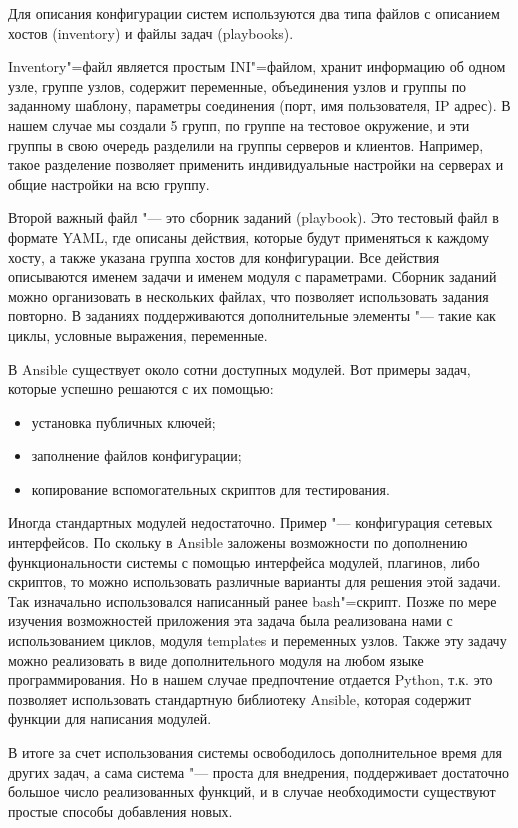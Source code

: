 \documentclass[10pt, a5paper]{article}
\begin{document}
Для описания конфигурации систем используются два типа файлов с описанием хостов (inventory) и файлы задач (playbooks).

Inventory"=файл является простым INI"=файлом, хранит информацию об одном узле, группе узлов, содержит переменные, объединения узлов и группы по заданному шаблону, параметры соединения (порт, имя пользователя, IP адрес). В нашем случае мы создали 5 групп, по группе на тестовое окружение, и эти группы в свою очередь  разделили на группы серверов и клиентов. Например, такое разделение позволяет применить индивидуальные настройки на серверах и общие настройки на всю группу.

Второй важный файл "--- это сборник заданий (playbook). Это тестовый файл в формате YAML, где описаны действия, которые будут применяться к каждому хосту, а также указана группа хостов для конфигурации. Все действия описываются именем задачи и именем модуля с параметрами. Сборник заданий можно организовать в нескольких файлах, что позволяет использовать задания повторно. В заданиях поддерживаются дополнительные элементы "--- такие как циклы, условные выражения, переменные.

В Ansible существует около сотни доступных модулей. Вот примеры задач, которые успешно решаются с их помощью:

\begin{itemize}
  \item установка публичных ключей;
  \item заполнение файлов конфигурации;
  \item копирование вспомогательных скриптов для тестирования.
\end{itemize}

Иногда стандартных модулей недостаточно. Пример "--- конфигурация сетевых интерфейсов. По скольку в Ansible заложены возможности по дополнению функциональности системы с помощью интерфейса модулей, плагинов, либо скриптов, то можно использовать различные варианты для решения этой задачи. Так изначально использовался написанный ранее bash"=скрипт. Позже по мере изучения возможностей приложения эта задача была реализована нами с использованием циклов, модуля templates и переменных узлов. Также эту задачу можно реализовать в виде дополнительного модуля на любом языке программирования. Но в нашем случае предпочтение отдается Python, т.к. это позволяет  использовать стандартную библиотеку Ansible, которая содержит функции для написания модулей.

В итоге за счет использования системы освободилось дополнительное время для других задач, а сама система "--- проста для внедрения, поддерживает достаточно большое число реализованных функций, и в случае необходимости существуют простые способы добавления новых.
\end{document}
